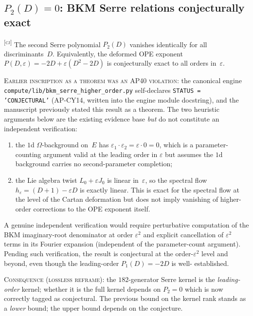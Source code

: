 \documentclass[11pt]{article}
\newcommand{\ClaimStatusConjectured}{\textsuperscript{\textsc{[cj]}}}
\begin{document}
\subsection{$P_2(D) = 0$: BKM Serre relations conjecturally exact}

\begin{conjecture}
\label{conj:bkm-serre-exact}
\ClaimStatusConjectured
The second Serre polynomial $P_2(D)$ vanishes identically for all
discriminants~$D$.  Equivalently, the deformed OPE exponent
$P(D, \varepsilon) = -2D + \varepsilon(D^2 - 2D)$ is conjecturally
exact to all orders in~$\varepsilon$.
\end{conjecture}

\begin{remark}
\label{rem:p2-status-correction}
\textsc{Earlier inscription as a theorem was an AP40 violation:} the
canonical engine \texttt{compute/lib/bkm\_serre\_higher\_order.py}
self-declares \texttt{STATUS = 'CONJECTURAL'} (AP-CY14, written into the
engine module docstring), and the manuscript previously stated this
result as a theorem.  The two heuristic arguments below are the
existing evidence base \emph{but} do not constitute an independent
verification:
\begin{enumerate}[label=\textup{(\roman*)}]
  \item the $1$d $\Omega$-background on~$E$ has
        $\varepsilon_1 \cdot \varepsilon_2 = \varepsilon \cdot 0 = 0$,
        which is a parameter-counting argument valid at the leading
        order in $\varepsilon$ but assumes the $1$d background carries
        no second-parameter completion;
  \item the Lie algebra twist $L_0 + \varepsilon J_0$ is linear
        in~$\varepsilon$, so the spectral flow
        $h_\varepsilon = (D+1) - \varepsilon D$ is exactly linear.  This
        is exact for the spectral flow at the level of the Cartan
        deformation but does not imply vanishing of higher-order
        corrections to the OPE exponent itself.
\end{enumerate}

A genuine independent verification would require perturbative
computation of the BKM imaginary-root denominator at order $\varepsilon^2$
and explicit cancellation of $\varepsilon^2$ terms in its Fourier
expansion (independent of the parameter-count argument).  Pending such
verification, the result is conjectural at the order-$\varepsilon^2$ level
and beyond, even though the leading-order $P_1(D) = -2D$ is well-
established.

\textsc{Consequence (lossless reframe):} the $182$-generator Serre
kernel is the \emph{leading-order} kernel; whether it is the full
kernel depends on $P_2 = 0$ which is now correctly tagged as
conjectural.  The previous bound on the kernel rank stands as a
\emph{lower} bound; the upper bound depends on the conjecture.
\end{remark}
\end{document}
